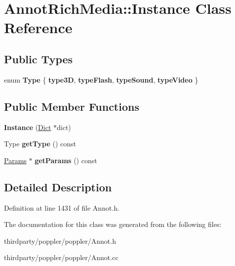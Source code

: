 \hypertarget{class_annot_rich_media_1_1_instance}{}\section{Annot\+Rich\+Media\+:\+:Instance Class Reference}
\label{class_annot_rich_media_1_1_instance}
\subsection*{Public Types}
\begin{DoxyCompactItemize}
\item 
\mbox{\label{class_annot_rich_media_1_1_instance_af1c064a31ed176d7fa1ce8fc943ea58d}} 
enum {\bfseries Type} \{ {\bfseries type3D}, 
{\bfseries type\+Flash}, 
{\bfseries type\+Sound}, 
{\bfseries type\+Video}
 \}
\end{DoxyCompactItemize}
\subsection*{Public Member Functions}
\begin{DoxyCompactItemize}
\item 
\mbox{\label{class_annot_rich_media_1_1_instance_a4eca94187ea2bfb6928af8adb9fc6a07}} 
{\bfseries Instance} (\hyperlink{class_dict}{Dict} $\ast$dict)
\item 
\mbox{\label{class_annot_rich_media_1_1_instance_a0b25722b0861079f966bab1c51425c2b}} 
Type {\bfseries get\+Type} () const
\item 
\mbox{\label{class_annot_rich_media_1_1_instance_a831baa5ee47fd81e133c113d73282406}} 
\hyperlink{class_annot_rich_media_1_1_params}{Params} $\ast$ {\bfseries get\+Params} () const
\end{DoxyCompactItemize}


\subsection{Detailed Description}


Definition at line 1431 of file Annot.\+h.



The documentation for this class was generated from the following files\+:\begin{DoxyCompactItemize}
\item 
thirdparty/poppler/poppler/Annot.\+h\item 
thirdparty/poppler/poppler/Annot.\+cc\end{DoxyCompactItemize}
